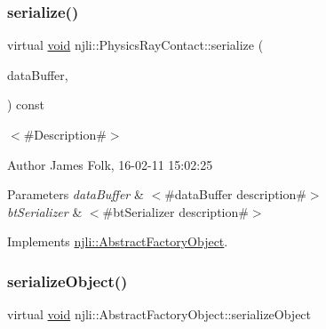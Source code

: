 \mbox{\label{classnjli_1_1_physics_ray_contact_a7dc16a5e0bd9c514c615393f2e96a99b}} 
\subsubsection{\texorpdfstring{serialize()}{serialize()}}
{\footnotesize\ttfamily virtual \mbox{\hyperlink{_thread_8h_af1e856da2e658414cb2456cb6f7ebc66}{void}} njli\+::\+Physics\+Ray\+Contact\+::serialize (\begin{DoxyParamCaption}\item[{\mbox{\hyperlink{_thread_8h_af1e856da2e658414cb2456cb6f7ebc66}{void}} $\ast$}]{data\+Buffer,  }\item[{bt\+Serializer $\ast$}]{ }\end{DoxyParamCaption}) const\hspace{0.3cm}{\ttfamily [virtual]}}



$<$\#\+Description\#$>$ 

\begin{DoxyAuthor}{Author}
James Folk, 16-\/02-\/11 15\+:02\+:25
\end{DoxyAuthor}

\begin{DoxyParams}{Parameters}
{\em data\+Buffer} & $<$\#data\+Buffer description\#$>$ \\
\hline
{\em bt\+Serializer} & $<$\#bt\+Serializer description\#$>$ \\
\hline
\end{DoxyParams}


Implements \mbox{\hyperlink{classnjli_1_1_abstract_factory_object_aad2fbe86fb3bdecf02918a96b9c57976}{njli\+::\+Abstract\+Factory\+Object}}.

\mbox{\label{classnjli_1_1_physics_ray_contact_a4fc4bcd9d1930911474210c047372fc0}} 
\subsubsection{\texorpdfstring{serialize\+Object()}{serializeObject()}}
{\footnotesize\ttfamily virtual \mbox{\hyperlink{_thread_8h_af1e856da2e658414cb2456cb6f7ebc66}{void}} njli\+::\+Abstract\+Factory\+Object\+::serialize\+Object}

